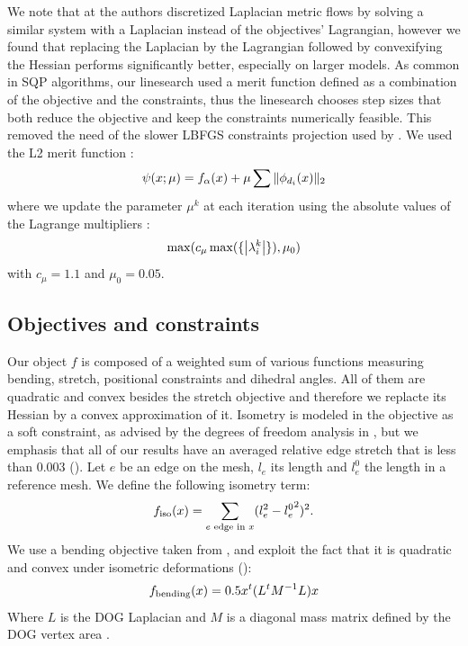 We note that at \cite{rabi2018shape} the authors discretized Laplacian metric flows by solving a similar system with a Laplacian instead of the objectives' Lagrangian, however we found that replacing the Laplacian by the Lagrangian followed by convexifying the Hessian performs significantly better, especially on larger models. As common in SQP algorithms, our linesearch used a merit function defined as a combination of the objective and the constraints, thus the linesearch chooses step sizes that both reduce the objective and keep the constraints numerically feasible. This removed the need of the slower LBFGS constraints projection used by \cite{rabi18,rabi2018shape}. We used the L2 merit function \cite{nocedal}:
\begin{equation}
\psi(x;\mu) = f_\alpha(x)+\mu\sum\|\phi_{d_i}(x)\|_2
\end{equation}
where we update the parameter $\mu^k$ at each iteration using the absolute values of the Lagrange multipliers \cite{nocedal}:
\begin{equation}
\max(c_\mu \max(\{\left\vert\lambda_i^k\right\vert\}), \mu_0)	
\end{equation}
with $c_\mu = 1.1$ and $\mu_0 = 0.05$.

\subsection{Objectives and constraints} \label{sec:dog_obj}
Our object $f$ is composed of a weighted sum of various functions measuring bending, stretch, positional constraints and dihedral angles. All of them are quadratic and convex besides the stretch objective and therefore we replacte its Hessian by a convex approximation of it. Isometry is modeled in the objective as a soft constraint, as advised by the degrees of freedom analysis in \cite{rabi18,rabi2018shape}, but we emphasis that all of our results have an averaged relative edge stretch that is less than $0.003$ (). Let $e$ be an edge on the mesh, $l_e$ its length and $l_e^0$ the length in a reference mesh. We define the following isometry term:
\begin{equation}
f_\text{iso}(x) = \sum_{e \text{ edge in } x} (l_e^2 - {l_e^0}^2)^2.
\end{equation}
We use a bending objective taken from \cite{rabi2018shape}, and exploit the fact that it is quadratic and convex under isometric deformations (\cite{quadratic_bending}):
\begin{equation}
f_\text{bending}(x) = 0.5x^t(L^tM^{-1}L)x
\end{equation}
Where $L$ is the DOG Laplacian and $M$ is a diagonal mass matrix defined by the DOG vertex area \cite{rabi2018shape}.\\
